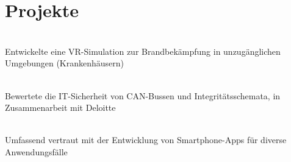 \documentclass[]{deedy-resume-openfont}
\begin{document}
\section{Projekte}
\raggedright


\\
Entwickelte eine VR-Simulation zur Brandbekämpfung in unzugänglichen Umgebungen (Krankenhäusern)
\sectionsep
  

\\
Bewertete die IT-Sicherheit von CAN-Bussen und Integritätsschemata, in Zusammenarbeit mit Deloitte\\
\sectionsep
  

\\
Umfassend vertraut mit der Entwicklung von Smartphone-Apps für diverse Anwendungsfälle\\
\sectionsep
\end{document}
